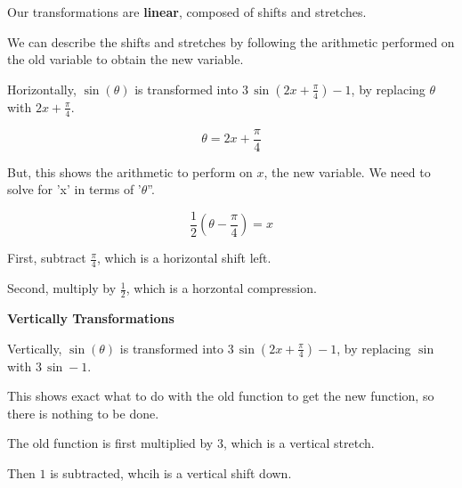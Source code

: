 \documentclass{ximera}
\begin{document}
Our transformations are \textbf{linear}, composed of shifts and stretches.

We can describe the shifts and stretches by following the arithmetic performed on the old variable to obtain the new variable.

Horizontally, $\sin(\theta)$ is transformed into $3 \, \sin(2x+\tfrac{\pi}{4}) - 1$, by replacing $\theta$ with $2x+\tfrac{\pi}{4}$.


\[ \theta =  2x+\frac{\pi}{4}\]

But, this shows the arithmetic to perform on $x$, the new variable.  We need to solve for 'x' in terms of '$\theta$''.



 \[ \frac{1}{2} \left( \theta -  \frac{\pi}{4} \right) =  x\]


First, subtract $\frac{\pi}{4}$, which is a horizontal shift left.

Second, multiply by $\frac{1}{2}$, which is a horzontal compression.






\textbf{\textcolor{blue!55!black}{Vertically Transformations}} 



Vertically, $\sin(\theta)$ is transformed into $3 \, \sin(2x+\tfrac{\pi}{4}) - 1$, by replacing $\sin$ with $3 \, \sin - 1$.

This shows exact what to do with the old function to get the new function, so there is nothing to be done.

The old function is first multiplied by $3$, which is a vertical stretch.

Then $1$ is subtracted, whcih is a vertical shift down.
\end{document}
